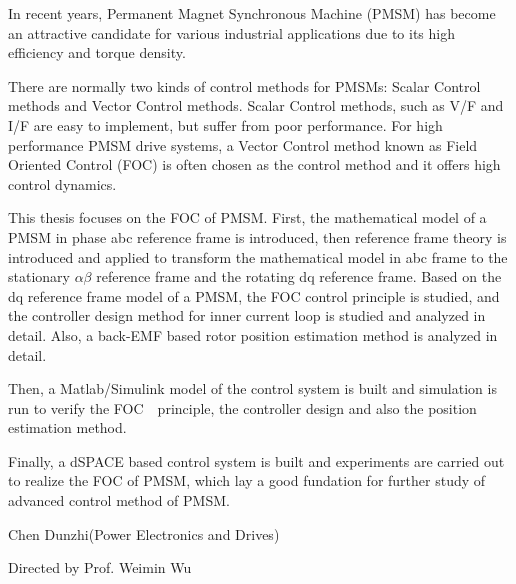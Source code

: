 \begin{abstractEn}
	In recent years, Permanent Magnet Synchronous Machine (PMSM) has become an attractive candidate for various industrial applications due to its high efficiency and torque density. 
	
	There are normally two kinds of control methods for PMSMs: Scalar Control methods and Vector Control methods. Scalar Control methods, such as V/F and I/F are easy to implement, but suffer from poor performance. For high performance PMSM drive systems, a Vector Control method known as Field Oriented Control (FOC) is often chosen as the control method and it offers high control dynamics. 
	
	This thesis focuses on the FOC of PMSM. First, the mathematical model of a PMSM in phase abc reference frame is introduced, then reference frame theory is introduced and applied to transform the mathematical model in abc frame to the stationary $\alpha\beta$ reference frame and the rotating dq reference frame. Based on the dq reference frame model of a PMSM, the FOC control principle is studied, and the controller design method for inner current loop is studied and analyzed in detail. Also, a back-EMF based rotor position estimation method is analyzed in detail.

	Then, a Matlab/Simulink model of the control system is built and simulation is run to verify the FOC　principle, the controller design  
	and also the position estimation method.
	
	Finally, a dSPACE based control system is built and experiments are carried out to realize the FOC of PMSM, which lay a good fundation for further study of advanced control method of PMSM.
	
	\begin{flushright}
		Chen Dunzhi(Power Electronics and Drives)
		
		Directed by Prof. Weimin Wu
    \par\end{flushright}
\end{abstractEn}
